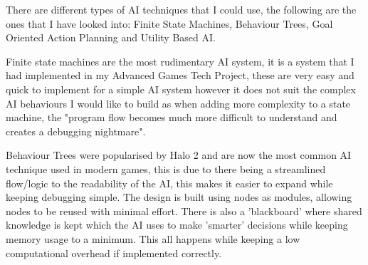 \documentclass[10pt]{report}
\begin{document}
There are different types of AI techniques that I could use, the following are the ones that I have looked into: Finite State Machines, Behaviour Trees, Goal Oriented Action Planning and Utility Based AI.

Finite state machines are the most rudimentary AI system, it is a system that I had implemented in my Advanced Games Tech Project, these are very easy and quick to implement for a simple AI system however it does not suit the complex AI behaviours I would like to build as when adding more complexity to a state machine, the "program flow becomes much more difficult to understand and creates a debugging nightmare"\cite{gameAiByExample}.

Behaviour Trees were popularised by Halo 2\cite{halo2} and are now the most common AI technique used in modern games, this is due to there being a streamlined flow/logic to the readability of the AI, this makes it easier to expand while keeping debugging simple. The design is built using nodes as modules, allowing nodes to be reused with minimal effort. There is also a 'blackboard' where shared knowledge is kept which the AI uses to make 'smarter' decisions while keeping memory usage to a minimum. This all happens while keeping a low computational overhead if implemented correctly. \cite{behaviourTrees}
\end{document}
